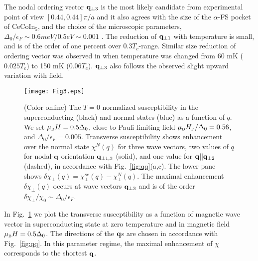 \documentclass[aps,prl,twocolumn,showpacs,amsmath,amssymb]{revtex4-1}
\newcommand{\cecoin}{CeCoIn$_5$}
\begin{document}
The nodal ordering vector  ${\bf q}_{\perp 3}$ is the most likely candidate 
from experimental point of view $[0.44,0.44]\pi/a$ \cite{Kenzelmann10_Qphase} and it also agrees with 
the size of the $\alpha$-FS pocket of \cecoin, \cite{suzuki11_sdw_vortex}
and the choice of the microscopic parameters, 
$\Delta_0/\epsilon_F \sim 0.6 meV/0.5 eV \sim 0.001$ \cite{Allan2013_stm115,Maehira03_fs115}. 
The reduction of  ${\bf q}_{\perp 1}$ with temperature is small, 
and is of the order of one percent over $0.3 T_c$-range. Similar size reduction of 
ordering vector was observed in \cite{Kenzelmann10_Qphase} when temperature 
was changed from 60 mK ($0.025 T_c$) to 150 mK ($0.06 T_c$). 
${\bf q}_{\perp 3}$ also follows the observed \cite{Kenzelmann10_Qphase} slight upward variation with field. 

\begin{figure}[t]
\texttt{[image: Fig3.eps]}
\caption{
	\label{fig:chi_enh}
	(Color online)
	The $T=0$ normalized susceptibility in the superconducting (black) and normal states (blue) as a function of $q$. 
We set $\mu_{\mbox{\tiny B}} H = 0.5\Delta_0$, close to Pauli limiting field $\mu_{\mbox{\tiny B}} H_{\mbox{\tiny P}}/\Delta_0 = 0.56$, 
and $\Delta_0/\epsilon_F = 0.005$. Transverse susceptibility shows enhancement over the normal state $\chi^N(q)$ 
for three wave vectors, two values of $q$ for nodal-${\bf q}$ orientation ${\bf q}_{\perp 1,3}$ (solid), 
and one value for ${\bf q} || {\bf q}_{\perp 2}$ (dashed), 
in accordance with Fig.~\ref{fig:qq}(a,c). 
The lower pane shows $\delta\chi_\perp(q) = \chi_\perp^{sc}(q) - \chi_\perp^{N}(q)$. 
%
%
The maximal enhancement $\delta \chi_{\perp}(q)$ occurs at wave vectors 
${\bf q}_{\perp 3}$ and is of the 
order $\delta \chi_\perp/\chi_0 \sim \Delta_0/\epsilon_F$. 
}
 \end{figure}
  

In Fig.~\ref{fig:chi_enh} we plot the transverse susceptibility as a function of magnetic wave vector 
in superconducting state at zero temperature and in 
magnetic field $\mu_{\mbox{\tiny B}} H = 0.5\Delta_0$. 
The directions of the ${\bf q}$s are chosen in accordance with Fig.~\ref{fig:qq}.
In this parameter regime, the maximal enhancement of $\chi$ corresponds to the shortest ${\bf q}$.
\end{document}
